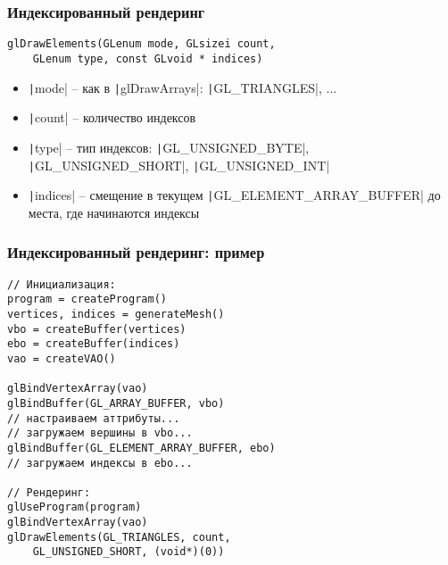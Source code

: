 \documentclass[10pt]{beamer}
\begin{document}
\begin{frame}[fragile]
\frametitle{Индексированный рендеринг}
\begin{verbatim}
glDrawElements(GLenum mode, GLsizei count,
    GLenum type, const GLvoid * indices)
\end{verbatim}
\vspace*{-0.5cm}
\pause
\begin{itemize}
\item \texttt|mode| -- как в \texttt|glDrawArrays|: \texttt|GL_TRIANGLES|, ...
\pause
\item \texttt|count| -- количество индексов
\pause
\item \texttt|type| -- тип индексов: \texttt|GL_UNSIGNED_BYTE|, \texttt|GL_UNSIGNED_SHORT|, \texttt|GL_UNSIGNED_INT|
\pause
\item \texttt|indices| -- смещение в текущем \texttt|GL_ELEMENT_ARRAY_BUFFER| до места, где начинаются индексы
\end{itemize}
\end{frame}

\begin{frame}[fragile]
\frametitle{Индексированный рендеринг: пример}
\begin{verbatim}
// Инициализация:
program = createProgram()
vertices, indices = generateMesh()
vbo = createBuffer(vertices)
ebo = createBuffer(indices)
vao = createVAO()

glBindVertexArray(vao)
glBindBuffer(GL_ARRAY_BUFFER, vbo)
// настраиваем аттрибуты...
// загружаем вершины в vbo...
glBindBuffer(GL_ELEMENT_ARRAY_BUFFER, ebo)
// загружаем индексы в ebo...

// Рендеринг:
glUseProgram(program)
glBindVertexArray(vao)
glDrawElements(GL_TRIANGLES, count,
    GL_UNSIGNED_SHORT, (void*)(0))
\end{verbatim}
\end{frame}
\end{document}
